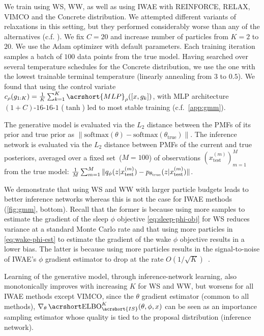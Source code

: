 We train using \gls{WS}, \gls{WW}, as well as using \gls{IWAE} with \acrshort{REINFORCE}, \acrshort{RELAX}, \gls{VIMCO} and the Concrete distribution.
We attempted different variants of relaxations \citep{Rolfe2016dvae,Vahdat2018dvaepp} in this setting, but they performed considerably worse than any of the alternatives (c.f. ).
We fix $C = 20$ and increase number of particles from $K = 2$ to $20$.
We use the Adam optimizer with default parameters.
Each training iteration samples a batch of $100$ data points from the true model.
Having searched over several temperature schedules for the Concrete distribution, we use the one with the lowest trainable terminal temperature (linearly annealing from $3$ to $0.5$).
We found that using the control variate $c_\rho(g_{1:K}) = \frac{1}{K} \sum_{k = 1}^K \acrshort{MLP}_\rho([x, g_k])$, with \gls{MLP} architecture $(1 + C)$-$16$-$16$-$1$ ($\tanh$) led to most stable training (c.f.\ \cref{app:gmm}).

The generative model is evaluated via the $L_2$ distance between the \glspl{PMF} of its prior and true prior as $\|\mathrm{softmax}(\theta) - \mathrm{softmax}(\theta_\text{true})\|$.
The inference network is evaluated via the $L_2$ distance between \glspl{PMF} of the current and true posteriors, averaged over a fixed set~(\(M=100\)) of observations $(x_{\text{test}}^{(m)})_{m = 1}^{M}$ from the true model: $\frac{1}{M} \sum_{m = 1}^M \|q_\phi(z \lvert x_{\text{test}}^{(m)}) - p_{\theta_{\text{true}}}(z \lvert x_{\text{test}}^{(m)})\|$.

We demonstrate that using \gls{WS} and \gls{WW} with larger particle budgets leads to better inference networks whereas this is not the case for \gls{IWAE} methods (\cref{fig:gmm}, bottom).
Recall that the former is because using more samples to estimate the gradient of the sleep $\phi$ objective \cref{eq:sleep-phi-obj} for \gls{WS} reduces variance at a standard Monte Carlo rate and that using more particles in \cref{eq:wake-phi-est} to estimate the gradient of the wake $\phi$ objective results in a lower bias.
The latter is because using more particles results in the signal-to-noise of \gls{IWAE}'s $\phi$ gradient estimator to drop at the rate $O(1 / \sqrt{K})$~\citep{Rainforth2018tighter}.

Learning of the generative model, through inference-network learning, also monotonically improves with increasing \(K\) for \gls{WS} and \gls{WW}, but worsens for all \gls{IWAE} methods except \gls{VIMCO}, since the $\theta$ gradient estimator (common to all methods), $\nabla_\theta \ELBO_{\acrshort{IS}}^K(\theta, \phi, x)$ can be seen as an importance sampling estimator whose quality is tied to the proposal distribution (inference network).

